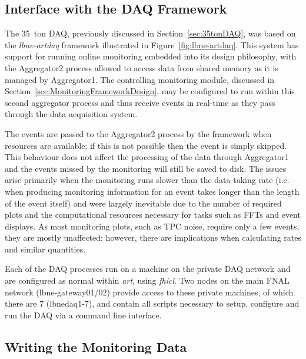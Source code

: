 \subsection{Interface with the DAQ Framework}

The 35~ton DAQ, previously discussed in Section~\ref{sec:35tonDAQ}, was based on the \textit{lbne-artdaq} framework illustrated in Figure~\ref{fig:lbne-artdaq}.  This system has support for running online monitoring embedded into its design philosophy, with the Aggregator2 process allowed to access data from shared memory as it is managed by Aggregator1.  The controlling monitoring module, discussed in Section~\ref{sec:MonitoringFrameworkDesign}, may be configured to run within this second aggregator process and thus receive events in real-time as they pass through the data acquisition system.

The events are passed to the Aggregator2 process by the framework when resources are available; if this is not possible then the event is simply skipped.  This behaviour does not affect the processing of the data through Aggregator1 and the events missed by the monitoring will still be saved to disk.  The issues arise primarily when the monitoring runs slower than the data taking rate (i.e. when producing monitoring information for an event takes longer than the length of the event itself) and were largely inevitable due to the number of required plots and the computational resources necessary for tasks such as FFTs and event displays.  As most monitoring plots, such as TPC noise, require only a few events, they are mostly unaffected; however, there are implications when calculating rates and similar quantities.

Each of the DAQ processes run on a machine on the private DAQ network and are configured as normal within \textit{art}, using \textit{fhicl}.  Two nodes on the main FNAL network (lbne-gateway01/02) provide access to these private machines, of which there are 7 (lbnedaq1-7), and contain all scripts necessary to setup, configure and run the DAQ via a command line interface.

\subsection{Writing the Monitoring Data}\label{sec:WritingMonitoringData}

